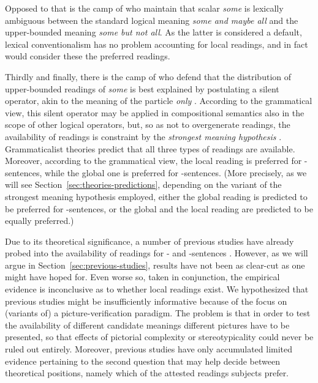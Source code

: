 \documentclass[fleqn,reqno,10pt,draft]{article}
\newcommand{\as}{\acro{as}}
\renewcommand{\es}{\acro{es}}
\newcommand{\mymark}[1]{{\color{mycol}{#1}}}
\begin{document}
Opposed to that is the camp of \mymark{lexical conventionalists}
\citep[e.g.][]{LevinsonPresumptiveMeanings2000,Chierchia:2004_ScalarImplicatures}
who maintain that scalar \emph{some} is lexically ambiguous between
the standard logical meaning \emph{some and maybe all} and the
upper-bounded meaning \emph{some but not all}. As the latter is
considered a default, lexical conventionalism has no problem
accounting for local readings, and in fact would consider these the
preferred readings. 

Thirdly and finally, there is the camp of \mymark{grammaticalists} who
defend that the distribution of upper-bounded readings of \emph{some}
is best explained by postulating a silent operator, akin to the
meaning of the particle \emph{only}
\citep{Chierchia2006:Broaden-Your-Vi,Fox2007:Free-Choice-and,Sauerland2012:The-Computation,ChierchiaFox2008:The-Grammatical,Chierchia2012:FC-Nominals-and}. According
to the grammatical view, this silent operator may be applied in
compositional semantics also in the scope of other logical operators,
but, so as not to overgenerate readings, the availability of readings
is constraint by the \emph{strongest meaning hypothesis}
\citep{DalrympleKanazawa1998:Reciprocal-Expr}. Grammaticalist theories
predict that all three types of readings are available. Moreover,
according to the grammatical view, the local reading is preferred for
\as-sentences, while the global one is preferred for
\es-sentences. (More precisely, as we will see
Section~\ref{sec:theories-predictions}, depending on the variant of
the strongest meaning hypothesis employed, either the global reading
is predicted to be preferred for \es-sentences, or the global and the
local reading are predicted to be equally preferred.)

Due to its theoretical significance, a number of previous studies have
already probed into the availability of readings for \as- and
\es-sentences
\citep[e.g.][]{GeurtsPouscoulous2009:Embedded-Implic,CliftonDube2010:Embedded-Implic,ChemlaSpector2010:Experimental-Ev}. However,
as we will argue in Section~\ref{sec:previous-studies}, results have
not been as clear-cut as one might have hoped for. Even worse so,
taken in conjunction, the empirical evidence is inconclusive as to
whether local readings exist. We hypothesized that previous studies
might be insufficiently informative because of the focus on (variants
of) a picture-verification paradigm.  The problem is that in order to test the availability of
different candidate meanings different pictures have to be presented,
so that effects of pictorial complexity or stereotypicality could
never be ruled out entirely. Moreover, previous studies have only
accumulated limited evidence pertaining to the second question that
may help decide between theoretical positions, namely which of the
attested readings subjects prefer.
\end{document}
